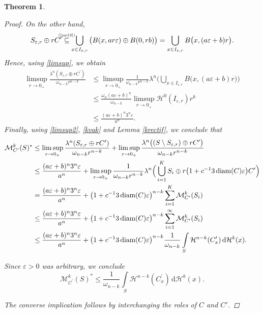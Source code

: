 \documentclass[pdflatex,sn-mathphys-num]{sn-jnl}
\theoremstyle{plain}
\newtheorem{theorem}{Theorem}[section]
\theoremstyle{definition}
\DeclareMathOperator{\diam}{\textup{diam}}
\newcommand{\dH}[1]{\,\mathrm d\mathcal{H}^{#1}}
\begin{document}
\begin{theorem}
\begin{proof}
On the other hand, \newcommand\myeqfkl{\mathrel{\stackrel{\makebox[0pt]{\mbox{\normalfont\tiny (\ref{pp12})}}}{\subseteq}}}
\[
S_{\varepsilon, r} \oplus rC^{\prime}\myeqfkl \bigcup_{x\in I_{\varepsilon, r}} \big(B(x, ar\varepsilon)\oplus B(0, rb)\big)=\bigcup_{x\in I_{\varepsilon, r}} B\big(x, (a\varepsilon+b)r\big).
\]
Hence, using \eqref{limsup}, we obtain
\begin{equation}\label{kvak}
\begin{split}
\limsup_{r\to0_+}\frac{\lambda^n(S_{\varepsilon, r}\oplus rC^{\prime})}{\omega_{n-k}r^{n-k}}
&\leq \limsup_{r\to0_+}\frac{1}{\omega_{n-k}r^{n-k}}\lambda^n\Big(\bigcup_{x\in I_{\varepsilon, r}} B\big(x, (a\varepsilon+b)r\big)\Big)\\&\leq\frac{\omega_n(a\varepsilon+b)^n}{\omega_{n-k}}\limsup_{r\to0_+}\mathcal{H}^0(I_{\varepsilon, r})r^k\\&\leq\frac{(a\varepsilon+b)^n3^n\varepsilon}{a^n}.
\end{split}
\end{equation}
Finally, using \eqref{limsup2}, \eqref{kvak} and Lemma \ref{krectif}, we conclude that
\[
\begin{split}
\mathcal{M}^k_{C^{\prime}}(S)^* &\leq \limsup_{r\to0_+}\frac{\lambda^n(S_{\varepsilon, r}\oplus rC^{\prime})}{\omega_{n-k}r^{n-k}} + \limsup_{r\to0_+}\frac{\lambda^n\big((S\setminus S_{\varepsilon, r})\oplus rC^{\prime}\big)}{\omega_{n-k}r^{n-k}}\\
&\leq \frac{(a\varepsilon+b)^n3^n\varepsilon}{a^n}+ \limsup_{r\to0_+}\frac{1}{\omega_{n-k}r^{n-k}}\lambda^n\Big(\bigcup_{i=1}^K S_i\oplus r\big(1+c^{-1}3\diam(C)\varepsilon\big)C^{\prime}\Big)\\
&= \frac{(a\varepsilon+b)^n3^n\varepsilon}{a^n}+\big(1+c^{-1}3\diam(C)\varepsilon\big)^{n-k}\sum_{i=1}^K\mathcal{M}^k_{C^{\prime}}(S_i)\\&\leq \frac{(a\varepsilon+b)^n3^n\varepsilon}{a^n}+\big(1+c^{-1}3\diam(C)\varepsilon\big)^{n-k}\sum_{i=1}^{\infty}\mathcal{M}^k_{C^{\prime}}(S_i)\\&\leq \frac{(a\varepsilon+b)^n3^n\varepsilon}{a^n}+\big(1+c^{-1}3\diam(C)\varepsilon\big)^{n-k}\frac{1}{\omega_{n-k}}\int\limits_{S}\mathcal{H}^{n-k}(C^{\prime}_x)\dH{k}(x).
\end{split}
\]

Since $\varepsilon>0$ was arbitrary, we conclude
\[
\mathcal{M}^k_{C^{\prime}}(S)^* \leq \frac{1}{\omega_{n-k}}\int\limits_{S}\mathcal{H}^{n-k}(C^{\prime}_x)\dH{k}(x).
\]


The converse implication follows by interchanging the roles of \(C\) and \(C'\).
\end{proof}
\end{theorem}
\end{document}
